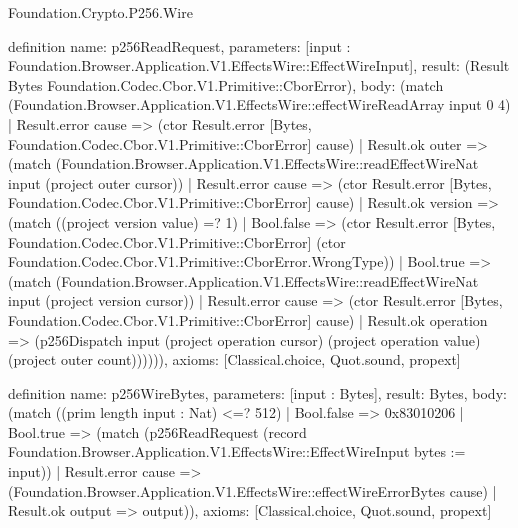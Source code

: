 \begin{lexlean}{Foundation.Crypto.P256.Wire}
\begin{semanticmodule}
definition{
  name: p256ReadRequest,
  parameters: [input : Foundation.Browser.Application.V1.EffectsWire::EffectWireInput],
  result: (Result Bytes Foundation.Codec.Cbor.V1.Primitive::CborError),
  body: (match (Foundation.Browser.Application.V1.EffectsWire::effectWireReadArray input 0 4)
    | Result.error cause => (ctor Result.error [Bytes, Foundation.Codec.Cbor.V1.Primitive::CborError] cause)
    | Result.ok outer => (match (Foundation.Browser.Application.V1.EffectsWire::readEffectWireNat input (project outer cursor))
      | Result.error cause => (ctor Result.error [Bytes, Foundation.Codec.Cbor.V1.Primitive::CborError] cause)
      | Result.ok version => (match ((project version value) =? 1)
        | Bool.false => (ctor Result.error [Bytes, Foundation.Codec.Cbor.V1.Primitive::CborError] (ctor Foundation.Codec.Cbor.V1.Primitive::CborError.WrongType))
        | Bool.true => (match (Foundation.Browser.Application.V1.EffectsWire::readEffectWireNat input (project version cursor))
          | Result.error cause => (ctor Result.error [Bytes, Foundation.Codec.Cbor.V1.Primitive::CborError] cause)
          | Result.ok operation => (p256Dispatch input (project operation cursor) (project operation value) (project outer count)))))),
  axioms: [Classical.choice, Quot.sound, propext]
}

definition{
  name: p256WireBytes,
  parameters: [input : Bytes],
  result: Bytes,
  body: (match ((prim length input : Nat) <=? 512)
    | Bool.false => 0x83010206
    | Bool.true => (match (p256ReadRequest (record Foundation.Browser.Application.V1.EffectsWire::EffectWireInput {bytes := input}))
      | Result.error cause => (Foundation.Browser.Application.V1.EffectsWire::effectWireErrorBytes cause)
      | Result.ok output => output)),
  axioms: [Classical.choice, Quot.sound, propext]
}
\end{semanticmodule}
\end{lexlean}
